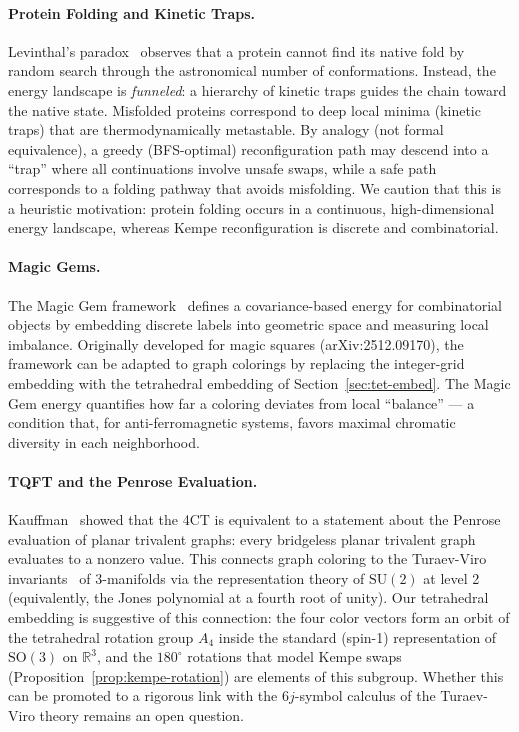 \paragraph{Protein Folding and Kinetic Traps.}
Levinthal's paradox~\cite{levinthal1969} observes that a protein cannot
find its native fold by random search through the astronomical number of
conformations. Instead, the energy landscape is \emph{funneled}: a
hierarchy of kinetic traps guides the chain toward the native state.
Misfolded proteins correspond to deep local minima (kinetic traps) that
are thermodynamically metastable. By analogy (not formal equivalence), a greedy (BFS-optimal)
reconfiguration path may descend into a ``trap'' where all
continuations involve unsafe swaps, while a safe path corresponds
to a folding pathway that avoids misfolding. We caution that this
is a heuristic motivation: protein folding occurs in a continuous,
high-dimensional energy landscape, whereas Kempe reconfiguration is
discrete and combinatorial.

\paragraph{Magic Gems.}
The Magic Gem framework~\cite{mathewson2025} defines a covariance-based
energy for combinatorial objects by embedding discrete labels into
geometric space and measuring local imbalance. Originally developed for
magic squares (arXiv:2512.09170), the framework can be adapted to
graph colorings by replacing the integer-grid embedding with the
tetrahedral embedding of Section~\ref{sec:tet-embed}. The Magic Gem energy
quantifies how far a coloring deviates from local ``balance'' — a
condition that, for anti-ferromagnetic systems, favors maximal
chromatic diversity in each neighborhood.

\paragraph{TQFT and the Penrose Evaluation.}
Kauffman~\cite{kauffman1990} showed that the 4CT is equivalent to a
statement about the Penrose evaluation of planar trivalent graphs: every
bridgeless planar trivalent graph evaluates to a nonzero value. This
connects graph coloring to the Turaev-Viro invariants~\cite{turaev1992}
of 3-manifolds via the representation theory of $\mathrm{SU}(2)$ at
level 2 (equivalently, the Jones polynomial at a fourth root of unity).
Our tetrahedral embedding is suggestive of this connection: the four
color vectors form an orbit of the tetrahedral rotation group $A_4$
inside the standard (spin-1) representation of $\mathrm{SO}(3)$ on
$\mathbb{R}^3$, and the $180^\circ$ rotations that model Kempe swaps
(Proposition~\ref{prop:kempe-rotation}) are elements of this subgroup.
Whether this can be promoted to a rigorous link with the
$6j$-symbol calculus of the Turaev-Viro theory remains an open
question.
